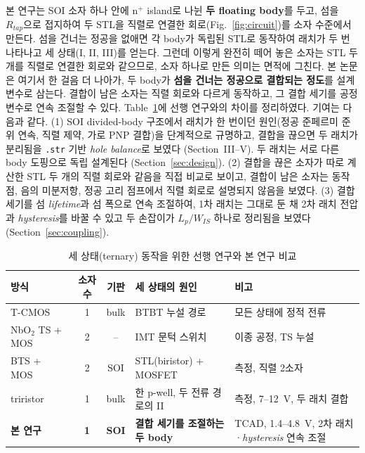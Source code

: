 \documentclass[journal]{IEEEtran}
\begin{document}
본 연구는 SOI 소자 하나 안에 n$^+$ island로 나뉜 \textbf{두 floating body}를 두고, 섬을 $R_{tap}$으로 접지하여 두 STL을 직렬로 연결한 회로(Fig.~\ref{fig:circuit})를 소자 수준에서 만든다. 섬을 건너는 정공을 없애면 각 body가 독립된 STL로 동작하여 래치가 두 번 나타나고 세 상태(I, II, III)를 얻는다. 그런데 이렇게 완전히 떼어 놓은 소자는 STL 두 개를 직렬로 연결한 회로와 같으므로, 소자 하나로 만든 의미는 면적에 그친다. 본 논문은 여기서 한 걸음 더 나아가, 두 body가 \textbf{섬을 건너는 정공으로 결합되는 정도}를 설계 변수로 삼는다. 결합이 남은 소자는 직렬 회로와 다르게 동작하고, 그 결합 세기를 공정 변수로 연속 조절할 수 있다. Table~\ref{tab:prior}에 선행 연구와의 차이를 정리하였다. 기여는 다음과 같다. (1) SOI divided-body 구조에서 래치가 한 번이던 원인(정공 준페르미 준위 연속, 직렬 제약, 가로 PNP 결합)을 단계적으로 규명하고, 결합을 끊으면 두 래치가 분리됨을 \texttt{.str} 기반 \textit{hole balance}로 보였다 (Section~III--V). 두 래치는 서로 다른 body 도핑으로 독립 설계된다 (Section~\ref{sec:design}). (2) 결합을 끊은 소자가 따로 계산한 STL 두 개의 직렬 회로와 같음을 직접 비교로 보이고, 결합이 남은 소자는 동작점, 음의 미분저항, 정공 고리 점프에서 직렬 회로로 설명되지 않음을 보였다. (3) 결합 세기를 섬 \textit{lifetime}과 섬 폭으로 연속 조절하여, 1차 래치는 그대로 둔 채 2차 래치 전압과 \textit{hysteresis}를 바꿀 수 있고 두 손잡이가 $L_p/W_{IS}$ 하나로 정리됨을 보였다 (Section~\ref{sec:coupling}).

\begin{table}[!t]
\caption{세 상태(ternary) 동작을 위한 선행 연구와 본 연구 비교}
\label{tab:prior}
\centering\scriptsize
\begin{tabular}{@{}p{}@{\,}c@{\,}c@{\,}p{}@{\,}p{}@{}}
\toprule
방식 & 소자 수 & 기판 & 세 상태의 원인 & 비고 \\ \midrule
T-CMOS~\cite{jeong_tcmos} & 1 & bulk & BTBT 누설 경로 & 모든 상태에 정적 전류 \\
NbO$_2$ TS + MOS~\cite{heo_nbo2} & 2 & -- & IMT 문턱 스위치 & 이종 공정, TS 누설 \\
BTS + MOS~\cite{han_bts,han_ptmos} & 2 & SOI\cite{han_bts} & STL(biristor) + MOSFET & 측정, 직렬 2소자 \\
triristor~\cite{noh_triristor} & 1 & bulk & 한 p-well, 두 전류 경로의 II & 측정, 7--12~V, 두 래치 결합 \\
\textbf{본 연구} & \textbf{1} & \textbf{SOI} & \textbf{결합 세기를 조절하는 두 body} & TCAD, 1.4--4.8~V, 2차 래치·\textit{hysteresis} 연속 조절 \\ \bottomrule
\end{tabular}
\end{table}
\end{document}
